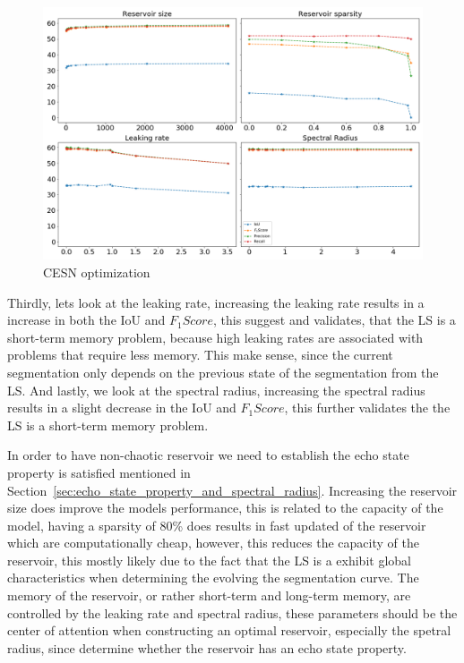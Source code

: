 \documentclass{WitsPhysicsReport}
\begin{document}
\begin{figure}[H]
\centering
  \includegraphics[width=1\textwidth]{Figure/Results/reservoir_optim.png}
 \caption{CESN optimization}
 \label{fig:esn_optimization}
\end{figure}
Thirdly, lets look at the leaking rate, increasing the leaking rate results in a increase in both the IoU and $F_{1}Score$, this suggest and validates, that the LS is a short-term memory problem, because high leaking rates are associated with problems that require less memory. This make sense, since the current segmentation only depends on the previous state of the segmentation from the LS. 
And lastly, we look at the spectral radius, increasing the spectral radius results in a slight decrease in the IoU and $F_{1}Score$, this further validates the the LS is a short-term memory problem.

In order to have non-chaotic reservoir we need to establish the echo state property is satisfied mentioned in Section~\ref{sec:echo_state_property_and_spectral_radius}. Increasing the reservoir size does improve the models performance, this is related to the capacity of the model, having a sparsity of 80\% does results in fast updated of the reservoir which are computationally cheap, however, this reduces the capacity of the reservoir, this mostly likely due to the fact that the LS is a exhibit global characteristics when determining the evolving the segmentation curve. The memory of the reservoir, or rather short-term and long-term memory, are controlled by the leaking rate and spectral radius, these parameters should be the center of attention when constructing an optimal reservoir, especially the spetral radius, since determine whether the reservoir has an echo state property.
\end{document}
